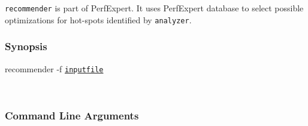\texttt{recommender} is part of PerfExpert. It uses PerfExpert database to select possible optimizations for hot-spots identified by \texttt{analyzer}.

     
\subsubsection{Synopsis}

\btt recommender -f \tt\underline{in}p\underline{utfile} \par
\ \ \ \ \ \ \ \ \ \normalfont

\subsubsection{Command Line Arguments}


